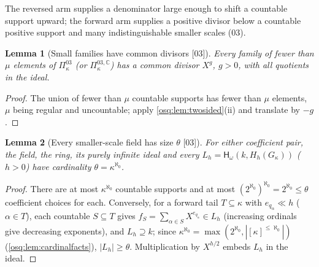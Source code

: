 \documentclass[11pt,letterpaper]{article}
\numberwithin{equation}{section}
\newtheorem{lemma}[lemma]{Lemma}
\theoremstyle{definition}
\theoremstyle{remark}
\theoremstyle{plain}
\newcommand{\C}{\mathbb C}
\newcommand{\Hc}[2]{\mathsf H_{\omega}(#1,#2)}
\newcommand{\src}[1]{\textup{\textsf{[#1]}}}
\begin{document}
The reversed arm supplies a denominator large enough to shift a countable support upward; the forward
arm supplies a positive divisor below a countable positive support and many indistinguishable smaller
scales (03).

\begin{lemma}[Small families have common divisors \src{03}]\label{osq:lem:smallcommon}
Every family of fewer than $\mu$ elements of $\Pi^{03}_\kappa$ (or $\Pi^{03,\C}_\kappa$) has a common
divisor $X^g$, $g>0$, with all quotients in the ideal.
\end{lemma}
\begin{proof}
The union of fewer than $\mu$ countable supports has fewer than $\mu$ elements, $\mu$ being regular
and uncountable; apply \cref{osq:lem:twosided}(ii) and translate by $-g$.
\end{proof}

\begin{lemma}[Every smaller-scale field has size $\theta$ \src{03}]\label{osq:lem:card03}
For either coefficient pair, the field, the ring, its purely infinite ideal and every
$L_h=\Hc k{H_h(G_\kappa)}$ ($h>0$) have cardinality $\theta=\kappa^{\aleph_0}$.
\end{lemma}
\begin{proof}
There are at most $\kappa^{\aleph_0}$ countable supports and at most
$(2^{\aleph_0})^{\aleph_0}=2^{\aleph_0}\le\theta$ coefficient choices for each. Conversely, for a
forward tail $T\subseteq\kappa$ with $e_{q_\alpha}\ll h$ ($\alpha\in T$), each countable $S\subseteq T$
gives $f_S=\sum_{\alpha\in S}X^{e_{q_\alpha}}\in L_h$ (increasing ordinals give decreasing exponents),
and $L_h\supseteq k$; since $\kappa^{\aleph_0}=\max(2^{\aleph_0},|[\kappa]^{\le\aleph_0}|)$
(\cref{osq:lem:cardinalfacts}), $|L_h|\ge\theta$. Multiplication by $X^{h/2}$ embeds $L_h$ in the
ideal.
\end{proof}
\end{document}
